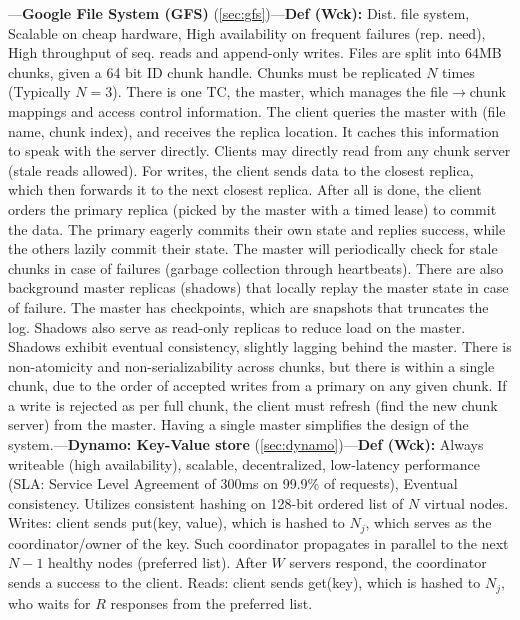 \begin{multicols}{2}

\noindent
---\textbf{Google File System (GFS)} (\ref{sec:gfs})---\textbf{Def (Wck):} Dist. file system, Scalable on cheap hardware, High availability on frequent failures (rep. need), High throughput of seq. reads and append-only writes.
Files are split into 64MB chunks, given a 64 bit ID chunk handle. Chunks must be replicated $N$ times (Typically $N=3$). There is 
one TC, the master, which manages the file$\to$chunk mappings and access control information.
The client queries the master with (file name, chunk index), and receives the replica location.
It caches this information to speak with the server directly. Clients may directly read from any chunk server (stale reads allowed).
For writes, the client sends data to the closest replica, which then forwards it to the next closest replica.
After all is done, the client orders the primary replica (picked by the master with a timed lease) to commit the data. The primary
eagerly commits their own state and replies success, while the others lazily commit their state. The 
master will periodically check for stale chunks in case of failures (garbage collection through heartbeats). 
There are also background master replicas (shadows) that locally replay the master state in case of failure.
The master has checkpoints, which are snapshots that truncates the log. Shadows also serve as read-only replicas to reduce load on the master.
Shadows exhibit eventual consistency, slightly lagging behind the master.
There is non-atomicity and non-serializability across chunks, but there is within a single chunk, due to the order of
accepted writes from a primary on any given chunk. If a write is rejected as per full chunk, the client must refresh (find the new chunk server) from the master.
Having a single master simplifies the design of the
system.---\textbf{Dynamo: Key-Value store} (\ref{sec:dynamo})---\textbf{Def (Wck):} Always writeable (high availability), scalable, decentralized, low-latency performance (SLA: Service Level Agreement of 300ms on 99.9\% of requests),
Eventual consistency. Utilizes consistent hashing on 128-bit ordered list of $N$ virtual nodes. Writes:
client sends put(key, value), which is hashed to $N_j$, which serves as the coordinator/owner of the key. Such coordinator propagates in parallel to the next $N-1$ healthy nodes (preferred list). After 
$W$ servers respond, the coordinator sends a success to the client. Reads: client sends get(key), which is hashed to $N_j$, who waits for $R$ responses from the preferred list. 

\end{multicols}
